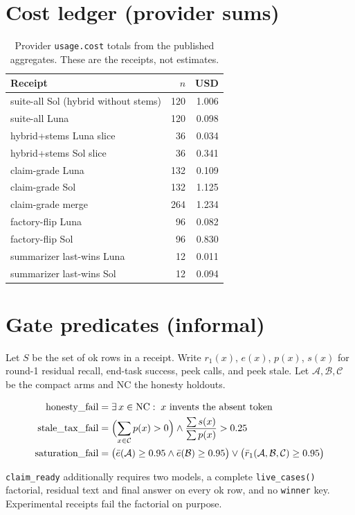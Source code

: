 \documentclass[11pt]{article}
\begin{document}
\appendix
\section{Cost ledger (provider sums)}
\label{app:cost}

\begin{table}[h]
\centering
\caption{Provider \texttt{usage.cost} totals from the published
aggregates. These are the receipts, not estimates.}
\label{tab:costs}
\begin{tabular}{@{}lrr@{}}
\toprule
Receipt & $n$ & USD \\
\midrule
suite-all Sol (hybrid without stems) & 120 & 1.006 \\
suite-all Luna & 120 & 0.098 \\
hybrid+stems Luna slice & 36 & 0.034 \\
hybrid+stems Sol slice & 36 & 0.341 \\
claim-grade Luna & 132 & 0.109 \\
claim-grade Sol & 132 & 1.125 \\
claim-grade merge & 264 & 1.234 \\
factory-flip Luna & 96 & 0.082 \\
factory-flip Sol & 96 & 0.830 \\
summarizer last-wins Luna & 12 & 0.011 \\
summarizer last-wins Sol & 12 & 0.094 \\
\bottomrule
\end{tabular}
\end{table}

\section{Gate predicates (informal)}
\label{app:gates}

Let $S$ be the set of ok rows in a receipt. Write $r_1(x)$, $e(x)$,
$p(x)$, $s(x)$ for round-1 residual recall, end-task success, peek
calls, and peek stale. Let $\mathcal{A},\mathcal{B},\mathcal{C}$ be
the compact arms and $\mathrm{NC}$ the honesty holdouts.

\begin{align}
\mathrm{honesty\_fail}
  &= \exists\, x\in\mathrm{NC}:\; x\text{ invents the absent token} \\
\mathrm{stale\_tax\_fail}
  &= \Bigl(\sum_{x\in\mathcal{C}} p(x) > 0\Bigr)
     \land
     \frac{\sum s(x)}{\sum p(x)} > 0.25 \\
\mathrm{saturation\_fail}
  &= \bigl(\bar e(\mathcal{A})\ge 0.95 \land \bar e(\mathcal{B})\ge 0.95\bigr)
     \lor
     \bigl(\bar r_1(\mathcal{A},\mathcal{B},\mathcal{C})\ge 0.95\bigr)
\end{align}

\texttt{claim\_ready} additionally requires two models, a complete
\texttt{live\_cases()} factorial, residual text and final answer on
every ok row, and no \texttt{winner} key. Experimental receipts fail
the factorial on purpose.
\end{document}
